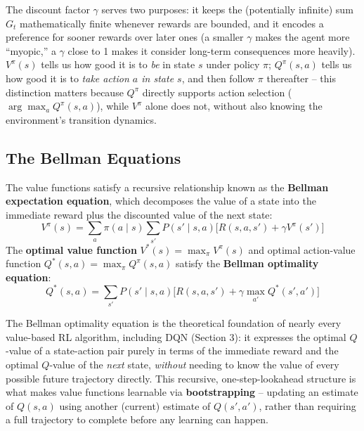 \documentclass[12pt,a4paper]{article}
\begin{document}
\begin{keyidea}
The discount factor $\gamma$ serves two purposes: it keeps the (potentially infinite) sum $G_t$ mathematically finite whenever rewards are bounded, and it encodes a preference for sooner rewards over later ones (a smaller $\gamma$ makes the agent more ``myopic,'' a $\gamma$ close to 1 makes it consider long-term consequences more heavily). $V^\pi(s)$ tells us how good it is to \emph{be} in state $s$ under policy $\pi$; $Q^\pi(s,a)$ tells us how good it is to \emph{take action $a$ in state $s$}, and then follow $\pi$ thereafter -- this distinction matters because $Q^\pi$ directly supports action selection ($\arg\max_a Q^\pi(s,a)$), while $V^\pi$ alone does not, without also knowing the environment's transition dynamics.
\end{keyidea}

\subsection{The Bellman Equations}


\begin{defbox}
The value functions satisfy a recursive relationship known as the \textbf{Bellman expectation equation}, which decomposes the value of a state into the immediate reward plus the discounted value of the next state:
\[
V^\pi(s) = \sum_a \pi(a\mid s) \sum_{s'} P(s'\mid s,a)\big[R(s,a,s') + \gamma V^\pi(s')\big]
\]
The \textbf{optimal value function} $V^*(s) = \max_\pi V^\pi(s)$ and optimal action-value function $Q^*(s,a) = \max_\pi Q^\pi(s,a)$ satisfy the \textbf{Bellman optimality equation}:
\[
Q^*(s,a) = \sum_{s'} P(s'\mid s,a)\Big[R(s,a,s') + \gamma \max_{a'} Q^*(s',a')\Big]
\]
\end{defbox}

\begin{keyidea}
The Bellman optimality equation is the theoretical foundation of nearly every value-based RL algorithm, including DQN (Section 3): it expresses the optimal $Q$-value of a state-action pair purely in terms of the immediate reward and the optimal $Q$-value of the \emph{next} state, \emph{without} needing to know the value of every possible future trajectory directly. This recursive, one-step-lookahead structure is what makes value functions learnable via \textbf{bootstrapping} -- updating an estimate of $Q(s,a)$ using another (current) estimate of $Q(s',a')$, rather than requiring a full trajectory to complete before any learning can happen.
\end{keyidea}
\end{document}
